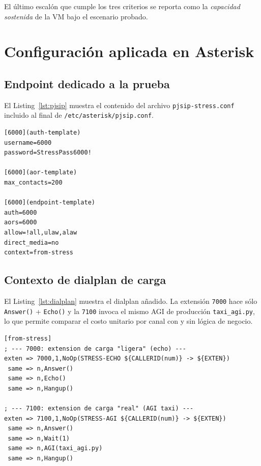 \documentclass[conference]{IEEEtran}
\begin{document}
El \'ultimo escal\'on que cumple los tres criterios se reporta como la
\textit{capacidad sostenida} de la VM bajo el escenario probado.

\section{Configuraci\'on aplicada en Asterisk}

\subsection{Endpoint dedicado a la prueba}

El Listing~\ref{lst:pjsip} muestra el contenido del archivo
\texttt{pjsip-stress.conf} incluido al final de
\texttt{/etc/asterisk/pjsip.conf}.

\begin{lstlisting}[language={},caption={\texttt{pjsip-stress.conf}: endpoint SIPp con auth digest.},label=lst:pjsip]
[6000](auth-template)
username=6000
password=StressPass6000!

[6000](aor-template)
max_contacts=200

[6000](endpoint-template)
auth=6000
aors=6000
allow=!all,ulaw,alaw
direct_media=no
context=from-stress
\end{lstlisting}

\subsection{Contexto de dialplan de carga}

El Listing~\ref{lst:dialplan} muestra el dialplan a\~nadido. La
extensi\'on \texttt{7000} hace s\'olo \texttt{Answer()} + \texttt{Echo()}
y la \texttt{7100} invoca el mismo AGI de producci\'on
\texttt{taxi\_agi.py}, lo que permite comparar el costo unitario por
canal con y sin l\'ogica de negocio.

\begin{lstlisting}[language={},caption={\texttt{extensions-stress.conf}: contexto \texttt{from-stress}.},label=lst:dialplan]
[from-stress]
; --- 7000: extension de carga "ligera" (echo) ---
exten => 7000,1,NoOp(STRESS-ECHO ${CALLERID(num)} -> ${EXTEN})
 same => n,Answer()
 same => n,Echo()
 same => n,Hangup()

; --- 7100: extension de carga "real" (AGI taxi) ---
exten => 7100,1,NoOp(STRESS-AGI ${CALLERID(num)} -> ${EXTEN})
 same => n,Answer()
 same => n,Wait(1)
 same => n,AGI(taxi_agi.py)
 same => n,Hangup()
\end{lstlisting}
\end{document}
